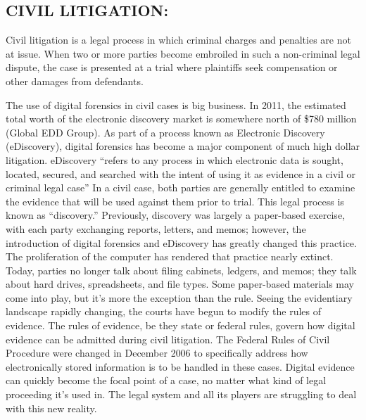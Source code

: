 \documentclass[10pt,british,english]{article}
\begin{document}
\subsection{CIVIL LITIGATION:}

Civil litigation is a legal process in which criminal charges and
penalties are not at issue. When two or more parties become embroiled
in such a non-criminal legal dispute, the case is presented at a trial
where plaintiffs seek compensation or other damages from defendants.

The use of digital forensics in civil cases is big business. In 2011,
the estimated total worth of the electronic discovery market is somewhere
north of \$780 million (Global EDD Group). As part of a process known
as Electronic Discovery (eDiscovery), digital forensics has become
a major component of much high dollar litigation. eDiscovery \textquotedblleft refers
to any process in which electronic data is sought, located, secured,
and searched with the intent of using it as evidence in a civil or
criminal legal case\textquotedblright{} In a civil case, both parties
are generally entitled to examine the evidence that will be used against
them prior to trial. This legal process is known as \textquotedblleft discovery.\textquotedblright{}
Previously, discovery was largely a paper-based exercise, with each
party exchanging reports, letters, and memos; however, the introduction
of digital forensics and eDiscovery has greatly changed this practice.
The proliferation of the computer has rendered that practice nearly
extinct. Today, parties no longer talk about filing cabinets, ledgers,
and memos; they talk about hard drives, spreadsheets, and file types.
Some paper-based materials may come into play, but it\textquoteright s
more the exception than the rule. Seeing the evidentiary landscape
rapidly changing, the courts have begun to modify the rules of evidence.
The rules of evidence, be they state or federal rules, govern how
digital evidence can be admitted during civil litigation. The Federal
Rules of Civil Procedure were changed in December 2006 to specifically
address how electronically stored information is to be handled in
these cases. Digital evidence can quickly become the focal point of
a case, no matter what kind of legal proceeding it\textquoteright s
used in. The legal system and all its players are struggling to deal
with this new reality.
\end{document}
